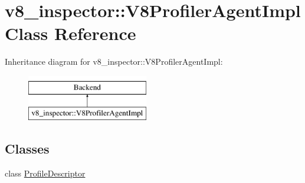 \hypertarget{classv8__inspector_1_1V8ProfilerAgentImpl}{}\section{v8\+\_\+inspector\+:\+:V8\+Profiler\+Agent\+Impl Class Reference}
\label{classv8__inspector_1_1V8ProfilerAgentImpl}
Inheritance diagram for v8\+\_\+inspector\+:\+:V8\+Profiler\+Agent\+Impl\+:\begin{figure}[H]
\begin{center}
\leavevmode
\includegraphics[height=2.000000cm]{classv8__inspector_1_1V8ProfilerAgentImpl}
\end{center}
\end{figure}
\subsection*{Classes}
\begin{DoxyCompactItemize}
\item 
class \mbox{\hyperlink{classv8__inspector_1_1V8ProfilerAgentImpl_1_1ProfileDescriptor}{Profile\+Descriptor}}
\end{DoxyCompactItemize}
